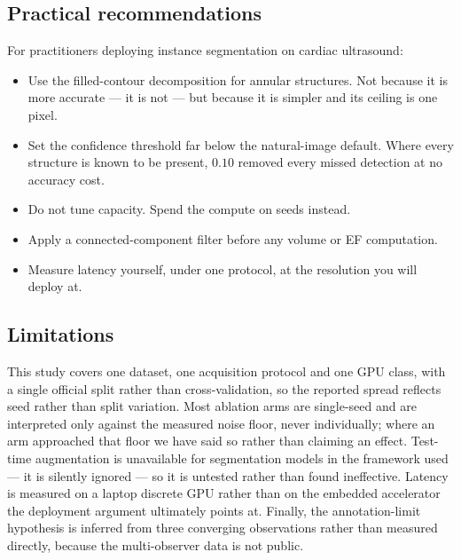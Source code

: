 \subsection{Practical recommendations}

For practitioners deploying instance segmentation on cardiac ultrasound:

\begin{itemize}
\item Use the filled-contour decomposition for annular structures. Not because
      it is more accurate --- it is not --- but because it is simpler and its
      ceiling is one pixel.
\item Set the confidence threshold far below the natural-image default. Where
      every structure is known to be present, $0.10$ removed every missed
      detection at no accuracy cost.
\item Do not tune capacity. Spend the compute on seeds instead.
\item Apply a connected-component filter before any volume or EF computation.
\item Measure latency yourself, under one protocol, at the resolution you will
      deploy at.
\end{itemize}

\subsection{Limitations}

This study covers one dataset, one acquisition protocol and one GPU class, with
a single official split rather than cross-validation, so the reported spread
reflects seed rather than split variation. Most ablation arms are single-seed
and are interpreted only against the measured noise floor, never individually;
where an arm approached that floor we have said so rather than claiming an
effect. Test-time augmentation is unavailable for segmentation models in the
framework used --- it is silently ignored --- so it is untested rather than
found ineffective. Latency is measured on a laptop discrete GPU rather than on
the embedded accelerator the deployment argument ultimately points at. Finally,
the annotation-limit hypothesis is inferred from three converging observations
rather than measured directly, because the multi-observer data is not public.
